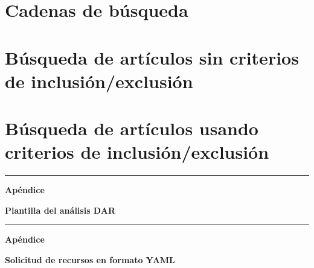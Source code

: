\section{Cadenas de búsqueda}\label{sec:cadenas-busqueda}



\section{Búsqueda de artículos sin criterios de inclusión/exclusión}\label{sec:busqueda-sin-criterios}


\FloatBarrier\section{Búsqueda de artículos usando criterios de inclusión/exclusión}\label{sec:busqueda-con-criterios}



\FloatBarrier
\cleardoublepage
{}
{}

\vspace{20pt}
{\centering \rule{\textwidth}{0.4pt} \par}
\vspace{20pt}
{\centering \normalfont\huge\bfseries Apéndice \thechapter \par}
\vspace{20pt}
{\centering \Huge\bfseries Plantilla del análisis DAR \par}
\vspace{40pt}

\label{apendice:plantilla-dar}






\FloatBarrier
\cleardoublepage
{}
{}

\vspace{20pt}
{\centering \rule{\textwidth}{0.4pt} \par}
\vspace{20pt}
{\centering \normalfont\huge\bfseries Apéndice \thechapter \par}
\vspace{20pt}
{\centering \Huge\bfseries Solicitud de recursos en formato YAML \par}
\vspace{40pt}

